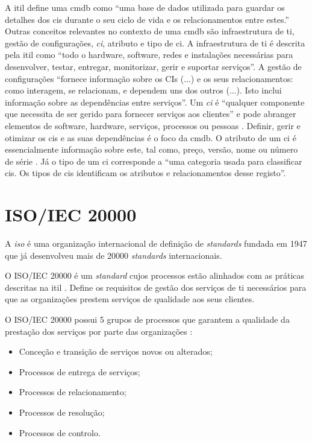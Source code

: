 \documentclass[
  oneside,
  11pt, a4paper,
  footinclude=true,
  headinclude=true,
  cleardoublepage=empty
]{scrbook}
\begin{document}
A \gls{itil} define uma \gls{cmdb} como ``uma base de dados utilizada para guardar os detalhes dos \glspl{ci} durante o seu ciclo de vida e os relacionamentos entre estes.'' Outras conceitos relevantes no contexto de uma \gls{cmdb} são infraestrutura de \gls{ti}, gestão de configurações, \textit{\acrlong{ci}}, atributo e tipo de \gls{ci}. A infraestrutura de \gls{ti} é descrita pela \gls{itil} como ``todo o hardware, software, redes e instalações necessárias para desenvolver, testar, entregar, monitorizar, gerir e suportar serviços''. A gestão de configurações ``fornece informação sobre os CIs (...) e os seus relacionamentos: como interagem, se relacionam, e dependem uns dos outros (...). Isto inclui informação sobre as dependências entre serviços''. Um \textit{\acrlong{ci}} é ``qualquer componente que necessita de ser gerido para fornecer serviços aos clientes'' e pode abranger elementos de software, hardware, serviços, processos ou pessoas \cite{itil4}. Definir, gerir e otimizar os \glspl{ci} e as suas dependências é o foco da \gls{cmdb}. O atributo de um \gls{ci} é essencialmente informação sobre este, tal como, preço, versão, nome ou número de série \cite{cmdbsystems}. Já o tipo de um \gls{ci} corresponde a ``uma categoria usada para classificar \glspl{ci}. Os tipos de \glspl{ci} identificam os atributos e relacionamentos desse registo''.

\section{ISO/IEC 20000}

A \textit{\acrfull{iso}} \cite{iso} é uma organização internacional de definição de \textit{standards} fundada em 1947 que já desenvolveu mais de 20000 \textit{standards} internacionais.

O ISO/IEC 20000 \cite{iso20000} é um \textit{standard} cujos processos estão alinhados com as práticas descritas na \gls{itil} \cite{itil4}. Define os requisitos de gestão dos serviços de \gls{ti} necessários para que as organizações prestem serviços de qualidade aos seus clientes.

O ISO/IEC 20000 possui 5 grupos de processos que garantem a qualidade da prestação dos serviços por parte das organizações \cite{marcelino2018visao}:
\begin{itemize}
    \item Conceção e transição de serviços novos ou alterados;
    \item Processos de entrega de serviços;
    \item Processos de relacionamento;
    \item Processos de resolução;
    \item Processos de controlo.
\end{itemize}
\end{document}
